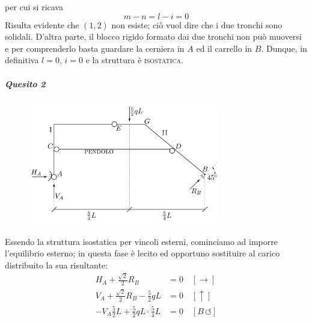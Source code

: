 per cui si ricava 
\begin{equation*}
m - n = l - i = 0
\end{equation*}
Risulta evidente che $(1, 2)$ non esiste; ciò vuol dire che i due tronchi sono solidali. D'altra parte, il blocco rigido formato dai due tronchi non può muoversi e per comprenderlo basta guardare la cerniera in $A$ ed il carrello in $B$. Dunque, in definitiva $l=0$, $i=0$ e la struttura è \textsc{isostatica}. 
\subparagraph{Quesito 2}
\renewcommand{\thefigure}{10.1~-~2}
\begin{figure}[ht]
\centering
\includegraphics[width=0.75\textwidth]{Immagini/Parte_10/Esercizio10_1_1/Esercizio10_1_2.pdf}
\caption{}
\label{Esercizio10-1-2}
\end{figure}
Essendo la struttura isostatica per vincoli esterni, cominciamo ad imporre l'equilibrio esterno; in questa fase è lecito ed opportuno sostituire al carico distribuito la sua risultante:
\begin{subequations}
\begin{align}
H_{A} + \frac{\sqrt{2}}{2}R_{B} &= 0 \quad [\rightarrow] \label{equazione10-1-1a} \tag{10.1.1a} \\
V_{A} + \frac{\sqrt{2}}{2}R_{B} - \frac{5}{2} qL &= 0 \quad [\uparrow] \label{equazione10-1-1b} \tag{10.1.1b} \\ 
-V_{A}\frac{5}{2}L + \frac{5}{2}qL \cdot \frac{5}{4}L &= 0 \quad [B\, \circlearrowleft] \label{equazione10-1-1c} \tag{10.1.1c}
\end{align}
\end{subequations}
